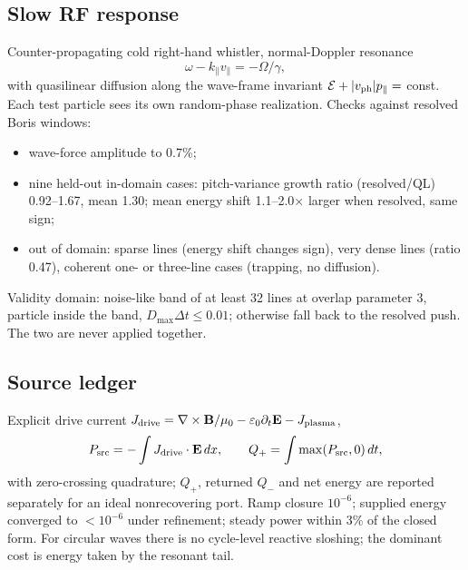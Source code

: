 \documentclass[10pt,a4paper]{article}
\begin{document}
\subsection{Slow RF response}
Counter-propagating cold right-hand whistler, normal-Doppler resonance
\begin{equation}
\omega-k_\parallel v_\parallel=-\Omega/\gamma ,
\end{equation}
with quasilinear diffusion along the wave-frame invariant $\mathcal E+|v_{\rm ph}|p_\parallel=$ const.
Each test particle sees its own random-phase realization. Checks against resolved Boris windows:
\begin{itemize}
\item wave-force amplitude to 0.7\%;
\item nine held-out in-domain cases: pitch-variance growth ratio (resolved/QL) 0.92--1.67, mean 1.30; mean energy shift 1.1--2.0$\times$ larger when resolved, same sign;
\item out of domain: sparse lines (energy shift changes sign), very dense lines (ratio 0.47), coherent one- or three-line cases (trapping, no diffusion).
\end{itemize}
Validity domain: noise-like band of at least 32 lines at overlap parameter 3, particle inside the band,
$D_{\max}\Delta t\le0.01$; otherwise fall back to the resolved push. The two are never applied together.

\subsection{Source ledger}
Explicit drive current $J_{\rm drive}=\nabla\times\mathbf B/\mu_0-\varepsilon_0\partial_t\mathbf E-J_{\rm plasma}$,
\begin{equation}
P_{\rm src}=-\int J_{\rm drive}\cdot\mathbf E\,dx,\qquad Q_+=\int\max(P_{\rm src},0)\,dt ,
\end{equation}
with zero-crossing quadrature; $Q_+$, returned $Q_-$ and net energy are reported separately for an ideal
nonrecovering port. Ramp closure $10^{-6}$; supplied energy converged to $<10^{-6}$ under refinement; steady
power within 3\% of the closed form. For circular waves there is no cycle-level reactive sloshing; the
dominant cost is energy taken by the resonant tail.
\end{document}

